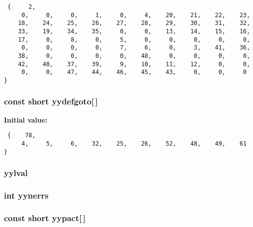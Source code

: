 \footnotesize\begin{verbatim} {     2,
     0,     0,     0,     1,     0,     4,    20,    21,    22,    23,
    18,    24,    25,    26,    27,    28,    29,    30,    31,    32,
    33,    19,    34,    35,     0,     0,    13,    14,    15,    16,
    17,     0,     8,     0,     5,     0,     0,     0,     0,     0,
     0,     0,     0,     0,     7,     6,     0,     3,    41,    36,
    38,     0,     0,     0,     0,    48,     0,     0,     0,     0,
    42,    40,    37,    39,     9,    10,    11,    12,     0,     0,
     0,     0,    47,    44,    46,    45,    43,     0,     0,     0
}\end{verbatim}\normalsize 
{}
\subsubsection{\setlength{\rightskip}{0pt plus 5cm}const short yydefgoto[$\,$]\hspace{0.3cm}{\tt  [static]}}\label{vcd__parser_8c_a92}


{\bf Initial value:}

\footnotesize\begin{verbatim} {    78,
     4,     5,     6,    32,    25,    26,    52,    48,    49,    61
}\end{verbatim}\normalsize 
{}
\subsubsection{ yylval}\label{vcd__parser_8c_a98}


\subsubsection{\setlength{\rightskip}{0pt plus 5cm}int yynerrs}\label{vcd__parser_8c_a99}


\subsubsection{\setlength{\rightskip}{0pt plus 5cm}const short yypact[$\,$]\hspace{0.3cm}{\tt  [static]}}\label{vcd__parser_8c_a93}



